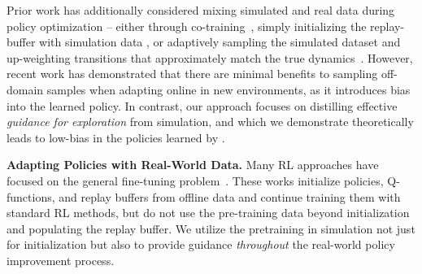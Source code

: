 \begin{comment}
. While going back from the real world to simulation can help target the simulation parameters more accurately~\citep{chebotar19close, ramos19bayessim, memmel24asid}, it cannot overcome inherent model misspecification, as we show in our experimental evaluation. Learning adaptive policies to account for changing real-world dynamics~\citep{haozhirma, rma, yu17prep} can help to some extent but is unable to guide exploration and adapt beyond the training dynamics range.\end{comment} Prior work has additionally considered mixing simulated and real data during policy optimization -- either through co-training~\citep{torne24rialto}, simply initializing the replay-buffer with simulation data \citep{smith2022walk, ball2023efficient}, or adaptively sampling the simulated dataset and up-weighting transitions that approximately match the true dynamics~\citep{eysenbach2020off, liu2022dara, xu2023cross, niu2022trust}. However, recent work \cite{zhou2024efficient} has demonstrated that there are minimal benefits to sampling off-domain samples when adapting online in new environments, as it introduces bias into the learned policy.  In contrast, our approach focuses on distilling effective \emph{guidance for exploration} from simulation, and which we demonstrate theoretically leads to low-bias in the policies learned by \Method . 

\noindent\textbf{Adapting Policies with Real-World Data.} 
Many RL approaches have focused on the general fine-tuning problem~\citep{Rajeswaran-RSS-18, nair2020awac, kostrikov2021offline, hu2023imitation, nakamoto2024cal}. These works initialize policies, Q-functions, and replay buffers from offline data and continue training them with standard RL methods, but do not use the pre-training data beyond initialization and populating the replay buffer. We utilize the pretraining in simulation not just for initialization but also to provide guidance \emph{throughout} the real-world policy improvement process. 


